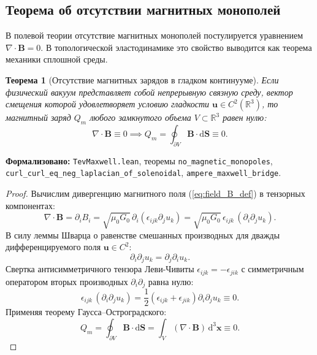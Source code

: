 \documentclass[11pt,a4paper]{article}
\newtheorem{theorem}{Теорема}
\theoremstyle{definition}
\theoremstyle{remark}
\begin{document}
\subsection{Теорема об отсутствии магнитных монополей}
	
В полевой теории отсутствие магнитных монополей постулируется уравнением $\nabla \cdot \mathbf{B} = 0$. В топологической эластодинамике это свойство выводится как теорема механики сплошной среды.
	
\begin{theorem}[Отсутствие магнитных зарядов в гладком континууме]
\label{thm:no_monopoles}
Если физический вакуум представляет собой непрерывную связную среду, вектор смещения которой удовлетворяет условию гладкости $\mathbf{u} \in C^2(\mathbb{R}^3)$, то магнитный заряд $Q_m$ любого замкнутого объема $V \subset \mathbb{R}^3$ равен нулю:
\begin{equation}
	\nabla \cdot \mathbf{B} \equiv 0 \implies Q_m = \oint_{\partial V} \mathbf{B} \cdot \mathrm{d}\mathbf{S} \equiv 0.
	\label{eq:div_B_zero_theorem}
\end{equation}
\end{theorem}

\noindent\small\textbf{Формализовано:} \texttt{TevMaxwell.lean}, теоремы \texttt{no\_magnetic\_monopoles}, \texttt{curl\_curl\_eq\_neg\_laplacian\_of\_solenoidal}, \texttt{ampere\_maxwell\_bridge}.


\begin{proof}
Вычислим дивергенцию магнитного поля (\ref{eq:field_B_def}) в тензорных компонентах:
\begin{equation}
	\nabla \cdot \mathbf{B} = \partial_i B_i = \sqrt{\mu_0 G_0} \, \partial_i (\epsilon_{ijk} \partial_j u_k) = \sqrt{\mu_0 G_0} \, \epsilon_{ijk} \, (\partial_i \partial_j u_k).
\end{equation}
В силу леммы Шварца о равенстве смешанных производных для дважды дифференцируемого поля $\mathbf{u} \in C^2$:
\begin{equation}
	\partial_i \partial_j u_k = \partial_j \partial_i u_k.
\end{equation}
Свертка антисимметричного тензора Леви-Чивиты $\epsilon_{ijk} = -\epsilon_{jik}$ с симметричным оператором вторых производных $\partial_i \partial_j$ равна нулю:
\begin{equation}
	\epsilon_{ijk} \, (\partial_i \partial_j u_k) = \frac{1}{2} (\epsilon_{ijk} + \epsilon_{jik}) \partial_i \partial_j u_k \equiv 0.
\end{equation}
Применяя теорему Гаусса--Остроградского:
\begin{equation}
	Q_m = \oint_{\partial V} \mathbf{B} \cdot \mathrm{d}\mathbf{S} = \int_V (\nabla \cdot \mathbf{B}) \, \mathrm{d}^3\mathbf{x} \equiv 0.
\end{equation}
\end{proof}
	
\end{document}
